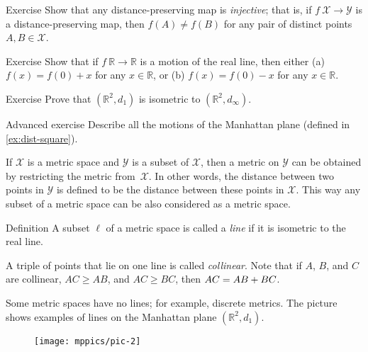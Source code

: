 \begin{thm}{Exercise}\label{ex:dist-preserv=>injective}
Show that any distance-preserving map is \emph{injective};
that is, if $f\:\mathcal X\to\mathcal Y$ is a distance-preserving map, 
then $f(A)\ne f(B)$ for any pair of distinct points $A, B\in \mathcal X$.
\end{thm}

\begin{thm}{Exercise}\label{ex:motion-of-R}
Show that if $f\:\mathbb{R}\to\mathbb{R}$ is a motion of the real line,
then either (a)
$f(x)=f(0)+x$ for any $x\in \mathbb{R}$, 
or (b)
$f(x)=f(0)-x$ for any $x\in \mathbb{R}$. 

\end{thm}

\begin{thm}{Exercise}\label{ex:d_1=d_infty}
Prove that $(\mathbb{R}^2,d_1)$ is isometric to $(\mathbb{R}^2,d_\infty)$.
\end{thm}

\begin{thm}{Advanced exercise}\label{ad-ex:motions of Manhattan plane}
Describe all the motions of the Manhattan plane (defined in \ref{ex:dist-square}).
\end{thm}

If $\mathcal X$ is a metric space and $\mathcal Y$ is a subset of $\mathcal X$,
then a metric on $\mathcal Y$ can be obtained by restricting the metric from~$\mathcal X$. 
In other words, 
the distance between two points in $\mathcal Y$ is defined to be the distance between these points in $\mathcal X$.
This way any subset of a metric space can be also considered as a metric space. 

\begin{thm}{Definition}\label{def:line}
A subset $\ell$ of a metric space is called a \emph{line} if it is isometric to the real line.
\end{thm}

A triple of points that lie on one line is called \emph{collinear}.
Note that if $A$, $B$, and  $C$ are  collinear, $AC\ge AB$, and $AC\ge BC$, then $AC= AB+BC$.

Some metric spaces have no lines; for example, discrete metrics.
The picture shows examples of lines on the Manhattan plane $(\mathbb{R}^2,d_1)$. 
\begin{figure}[!ht]
\centering
\texttt{[image: mppics/pic-2]}
\end{figure}

